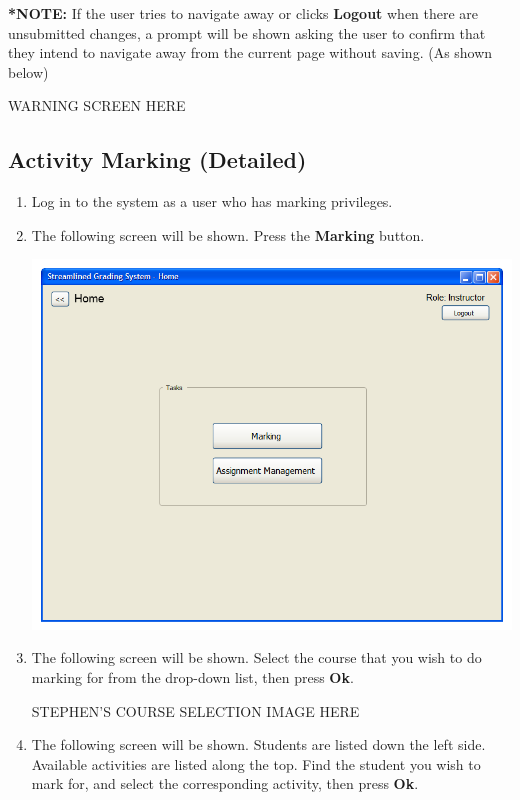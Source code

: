 \documentclass{article}
\begin{document}
\textbf{*NOTE:} If the user tries to navigate away or clicks \textbf{Logout} when 
there are unsubmitted changes, a prompt will be shown asking the user to confirm that 
they intend to navigate away from the current page without saving. (As shown below)
\begin{center} 
  WARNING SCREEN HERE
\end{center}

\subsection{Activity Marking (Detailed)}
\begin{enumerate}
  \item Log in to the system as a user who has marking privileges.
  \item The following screen will be shown.  Press the \textbf{Marking} button.
  \begin{center} 
   \includegraphics[scale=0.55]{../images/UIMockups/pngs/LandingPage}
  \end{center}
  \item The following screen will be shown.  Select the course that you wish
    to do marking for from the drop-down list, then press \textbf{Ok}.
    \begin{center} 
      STEPHEN'S COURSE SELECTION IMAGE HERE
    \end{center}
  \item The following screen will be shown.  Students are listed down the left
    side. Available activities are listed along the top.  Find the student you
    wish to mark for, and select the corresponding activity, then press \textbf{Ok}.

\end{enumerate}
\end{document}
